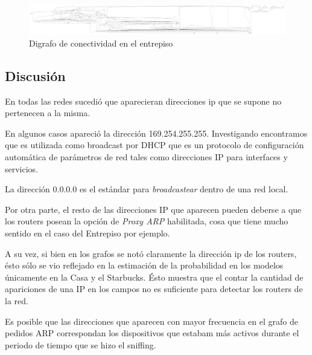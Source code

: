 \begin{figure}[H]
	\includegraphics[width=1.0\textwidth]{resultados/entrepiso/conectividad.pdf}
	\caption{Digrafo de conectividad en el entrepiso}
\end{figure}


\subsection{Discusi\'on}

        En todas las redes sucedi\'o que aparecieran direcciones ip que se supone
no pertenecen a la misma. 

        En algunos casos apareci\'o la direcci\'on 169.254.255.255. Investigando
encontramos que es utilizada como broadcast por DHCP que es un protocolo de 
configuraci\'on autom\'atica de par\'ametros de red tales como direcciones IP
para interfaces y servicios.

        La direcci\'on 0.0.0.0 es el est\'andar para \emph{broadcastear} dentro
de una red local.

        Por otra parte, el resto de las direcciones IP que aparecen pueden deberse
a que los routers posean la opci\'on de \emph{Proxy ARP} habilitada, cosa que tiene 
mucho sentido en el caso del Entrepiso por ejemplo.

        A su vez, si bien en los grafos se not\'o claramente la direcci\'on ip
de los routers, \'esto s\'olo se vio reflejado en la estimaci\'on de la probabilidad
en los modelos \'unicamente en la Casa y el Starbucks. \'Esto muestra que el contar la 
cantidad de apariciones de una IP en los campos no es suficiente para detectar
los routers de la red.

        Es posible que las direcciones que aparecen con mayor frecuencia en el grafo
de pedidos ARP correspondan los dispositivos que estabam m\'as activos durante el periodo
de tiempo que se hizo el sniffing.

